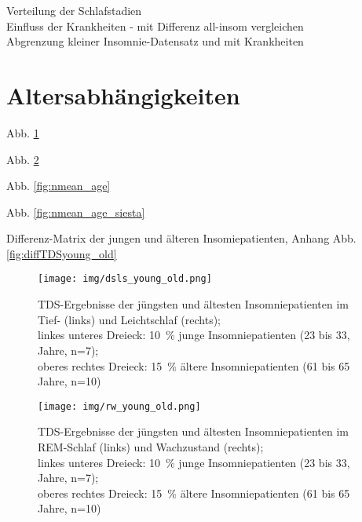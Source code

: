 Verteilung der Schlafstadien\\


Einfluss der Krankheiten - mit Differenz all-insom vergleichen\\

Abgrenzung kleiner Insomnie-Datensatz und mit Krankheiten\\



\section{Altersabhängigkeiten}

Abb. \ref{fig:dsls_young_old}

Abb. \ref{fig:rw_young_old}

Abb. \ref{fig:nmean_age}

Abb. \ref{fig:nmean_age_siesta}

Differenz-Matrix der jungen und älteren Insomiepatienten, Anhang Abb. \ref{fig:diffTDSyoung_old}

\begin{figure}[H]
	\centering
	\texttt{[image: img/dsls\_young\_old.png]}
	\caption[\acs{TDS}-Ergebnisse der jungen und älteren Insomniepatienten im Tief- und Leichtschlaf]{\acs{TDS}-Ergebnisse der jüngsten und ältesten Insomniepatienten im Tief- (links) und Leichtschlaf (rechts);\\linkes unteres Dreieck: 10~\% junge Insomniepatienten (23 bis 33, Jahre, n=7);\\oberes rechtes Dreieck:  15~\% ältere Insomniepatienten (61 bis 65 Jahre, n=10)}
	\label{fig:dsls_young_old}
\end{figure}

\begin{figure}[H]
	\centering
	\texttt{[image: img/rw\_young\_old.png]}
	\caption[\acs{TDS}-Ergebnisse der jüngsten und ältesten Insomniepatienten im REM-Schlaf und Wachzustand]{\acs{TDS}-Ergebnisse der jüngsten und ältesten Insomniepatienten im REM-Schlaf (links) und Wachzustand (rechts);\\linkes unteres Dreieck: 10~\% junge Insomniepatienten (23 bis 33, Jahre, n=7);\\oberes rechtes Dreieck:  15~\% ältere Insomniepatienten (61 bis 65 Jahre, n=10)}
	\label{fig:rw_young_old}
\end{figure}


